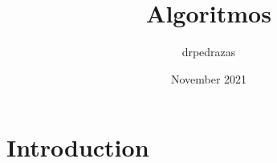 \documentclass{article}
\title{Algoritmos}
\author{drpedrazas }
\date{November 2021}
\begin{document}
\maketitle

\section{Introduction}
\end{document}
